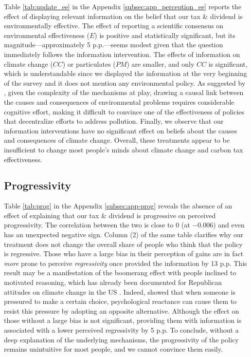 \documentclass[12pt]{article} %
\begin{document}

Table \ref{tab:update_ee} in the Appendix \ref{subsec:app_perception_ee} reports the effect of displaying relevant information on the belief that our tax \& dividend is environmentally effective. The effect of reporting a scientific consensus on environmental effectiveness ($E$) is positive and statistically significant, but its magnitude---approximately 5 p.p.---seems modest given that the question immediately follows the information intervention. The effects of information on climate change ($CC$) or particulates ($PM$) are smaller, and only $CC$ is significant, which is understandable since we displayed the information at the very beginning of the survey and it does not mention any environmental policy. As suggested by \citet{millner_beliefs_2016}, given the complexity of the mechanisms at play, drawing a causal link between the causes and consequences of environmental problems requires considerable cognitive effort, making it difficult to convince one of the effectiveness of policies that decentralize efforts to address pollution. Finally, we observe that our information interventions have no significant effect on beliefs about the causes and consequences of climate change. Overall, these treatments appear to be insufficient to change most people's minds about climate change and carbon tax effectiveness. %

\subsection{Progressivity\label{subsec:persistence-prog}}


Table \ref{tab:prog} in the Appendix \ref{subsec:app-prog} reveals the absence of an effect of explaining that our tax \& dividend is progressive on perceived progressivity. The correlation between the two is close to 0 (at $-0.006$) and even has an unexpected negative sign. Column (2) of the same table clarifies why our treatment does not change the overall share of people who think that the policy is regressive. Those who have a large bias in their perception of gains are in fact \textit{more} prone to perceive \textit{regressivity} once provided the information by 13 p.p. This result may be a manifestation of the boomerang effect with people inclined to motivated reasoning, which has already been documented for Republican attitudes on climate change in the US \citep{zhou_boomerangs_2016}. Indeed, \citet{hovland_communication_1953} showed that when someone is pressured to make a certain choice, psychological reactance \citep[theorized by][]{brehm_theory_1966} can cause them to resist this pressure by adopting an opposite alternative. Although the effect on those without a large bias is not significant, providing them with information is associated with a lower perceived regressivity by 5 p.p. To conclude, without a deep explanation of the underlying mechanisms, the progressivity of the policy remains unintuitive for most people, and we cannot convince them easily.
\end{document}

